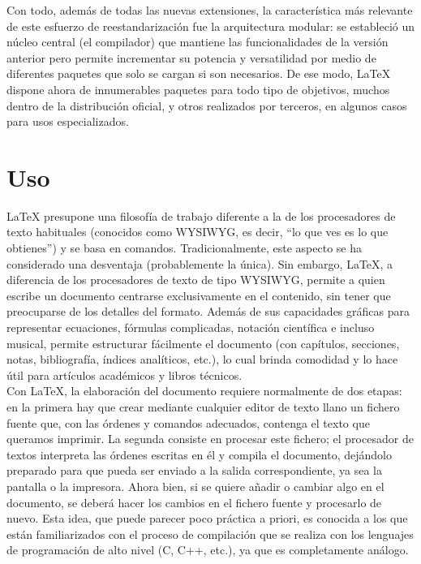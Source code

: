 \documentclass[12pt,a4paper,spanish]{book}
\begin{document}
Con todo, adem\'as de todas las nuevas extensiones, la caracter\'istica m\'as relevante de este esfuerzo de reestandarizaci\'on fue la arquitectura modular: se estableci\'o un n\'ucleo central (el compilador) que mantiene las funcionalidades de la versi\'on anterior pero permite incrementar su potencia y versatilidad por medio de diferentes paquetes que solo se cargan si son necesarios. De ese modo, \LaTeX{} dispone ahora de innumerables paquetes para todo tipo de objetivos, muchos dentro de la distribuci\'on oficial, y otros realizados por terceros, en algunos casos para usos especializados.

\section{Uso}
\LaTeX{} presupone una filosof\'ia de trabajo diferente a la de los procesadores de texto habituales (conocidos como WYSIWYG, es decir, ``lo que ves es lo que obtienes'') y se basa en comandos. Tradicionalmente, este aspecto se ha considerado una desventaja (probablemente la \'unica). Sin embargo, \LaTeX{}, a diferencia de los procesadores de texto de tipo WYSIWYG, permite a quien escribe un documento centrarse exclusivamente en el contenido, sin tener que preocuparse de los detalles del formato. Adem\'as de sus capacidades gr\'aficas para representar ecuaciones, f\'ormulas complicadas, notaci\'on cient\'ifica e incluso musical, permite estructurar f\'acilmente el documento (con cap\'itulos, secciones, notas, bibliograf\'ia, \'indices anal\'iticos, etc.), lo cual brinda comodidad y lo hace \'util para art\'iculos acad\'emicos y libros t\'ecnicos.\\

Con \LaTeX{}, la elaboraci\'on del documento requiere normalmente de dos etapas: en la primera hay que crear mediante cualquier editor de texto llano un fichero fuente que, con las \'ordenes y comandos adecuados, contenga el texto que queramos imprimir. La segunda consiste en procesar este fichero; el procesador de textos interpreta las \'ordenes escritas en \'el y compila el documento, dej\'andolo preparado para que pueda ser enviado a la salida correspondiente, ya sea la pantalla o la impresora. Ahora bien, si se quiere a\~nadir o cambiar algo en el documento, se deber\'a hacer los cambios en el fichero fuente y procesarlo de nuevo. Esta idea, que puede parecer poco pr\'actica a priori, es conocida a los que est\'an familiarizados con el proceso de compilaci\'on que se realiza con los lenguajes de programaci\'on de alto nivel (C, C++, etc.), ya que es completamente an\'alogo.\\
\end{document}
